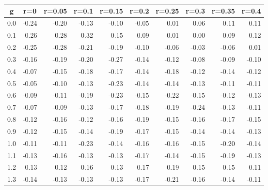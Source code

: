 %
\begin{table}[!tbp]
 \begin{center}
 \begin{tabular}{rrrrrrrrrr}\hline\hline
\multicolumn{1}{c}{g}&\multicolumn{1}{c}{r=0}&\multicolumn{1}{c}{r=0.05}&\multicolumn{1}{c}{r=0.1}&\multicolumn{1}{c}{r=0.15}&\multicolumn{1}{c}{r=0.2}&\multicolumn{1}{c}{r=0.25}&\multicolumn{1}{c}{r=0.3}&\multicolumn{1}{c}{r=0.35}&\multicolumn{1}{c}{r=0.4}\tabularnewline
\hline
0.0&-0.24&-0.20&-0.13&-0.10&-0.05& 0.01& 0.06& 0.11& 0.11\tabularnewline
0.1&-0.26&-0.28&-0.32&-0.15&-0.09& 0.01& 0.00& 0.09& 0.12\tabularnewline
0.2&-0.25&-0.28&-0.21&-0.19&-0.10&-0.06&-0.03&-0.06& 0.01\tabularnewline
0.3&-0.16&-0.19&-0.20&-0.27&-0.14&-0.12&-0.08&-0.09&-0.10\tabularnewline
0.4&-0.07&-0.15&-0.18&-0.17&-0.14&-0.18&-0.12&-0.14&-0.12\tabularnewline
0.5&-0.05&-0.10&-0.13&-0.23&-0.14&-0.14&-0.13&-0.11&-0.11\tabularnewline
0.6&-0.09&-0.11&-0.19&-0.23&-0.15&-0.22&-0.15&-0.12&-0.13\tabularnewline
0.7&-0.07&-0.09&-0.13&-0.17&-0.18&-0.19&-0.24&-0.13&-0.11\tabularnewline
0.8&-0.12&-0.16&-0.12&-0.16&-0.19&-0.15&-0.16&-0.17&-0.15\tabularnewline
0.9&-0.12&-0.15&-0.14&-0.19&-0.17&-0.15&-0.14&-0.14&-0.13\tabularnewline
1.0&-0.11&-0.11&-0.23&-0.14&-0.16&-0.16&-0.15&-0.20&-0.14\tabularnewline
1.1&-0.13&-0.16&-0.13&-0.13&-0.17&-0.14&-0.15&-0.19&-0.13\tabularnewline
1.2&-0.13&-0.12&-0.16&-0.13&-0.17&-0.19&-0.15&-0.15&-0.11\tabularnewline
1.3&-0.14&-0.13&-0.13&-0.13&-0.17&-0.21&-0.16&-0.14&-0.11\tabularnewline
\hline
\end{tabular}

\end{center}

\end{table}

